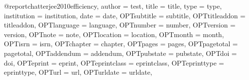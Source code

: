 @report{chatterjee2010efficiency,
	author = {test},
	title = {title},
	type = {type},
	institution = {institution},
	date = {date},
	OPTsubtitle = {subtitle},
	OPTtitleaddon = {titleaddon},
	OPTlanguage = {language},
	OPTnumber = {number},
	OPTversion = {version},
	OPTnote = {note},
	OPTlocation = {location},
	OPTmonth = {month},
	OPTisrn = {isrn},
	OPTchapter = {chapter},
	OPTpages = {pages},
	OPTpagetotal = {pagetotal},
	OPTaddendum = {addendum},
	OPTpubstate = {pubstate},
	OPTdoi = {doi},
	OPTeprint = {eprint},
	OPTeprintclass = {eprintclass},
	OPTeprinttype = {eprinttype},
	OPTurl = {url},
	OPTurldate = {urldate},
}
